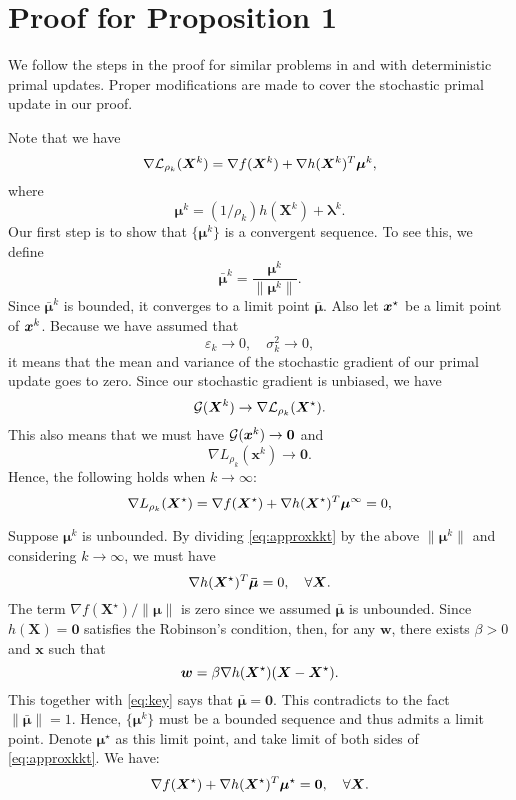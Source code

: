 \section{Proof for Proposition 1}\label{sec:proof}

We follow the steps in the proof for similar problems in \cite{fu2018anchor} and \cite{shi2017penalty} with deterministic primal updates. Proper modifications are made to cover the stochastic primal update in our proof.


Note that we have
              \[     \nabla{\cal L}_{\rho_k}(\boldsymbol{X}^k)= \nabla f(\boldsymbol{X}^k) + \nabla h(\boldsymbol{X}^k)^T\bm \mu^k,          \]
              where 
              \[      \bm \mu^k = (1/\rho_k)h(\bm X^k)+\bm \lambda^k.   
              \]
              Our first step is to show that $\{\bm \mu^k\}$ is a convergent sequence. To see this, we define 
              \[ \bm \bar{\bm \mu}^k = \frac{\bm \mu^k}{\|{\bm \mu}^k\|}. \]
              Since $\bm \bar{\bm \mu}^k$ is bounded, it converges to a limit point $\bm \bar{\bm \mu}$. Also let $\boldsymbol{x}^\star$ be a limit point of $\boldsymbol{x}^k$.
              Because we have assumed that 
              $$\varepsilon_k\rightarrow 0,\quad \sigma_k^2\rightarrow 0,$$ 
              it means that the mean and variance of the stochastic gradient of our primal update goes to zero.
              Since our stochastic gradient is unbiased, we have
              \[       {\cal G}(\boldsymbol{X}^k) \rightarrow \nabla {\cal L}_{\rho_k}(\boldsymbol{X}^\star). \]  
              This also means that  we must have ${\cal G}(\boldsymbol{x}^k)\rightarrow \bm 0$ and $$\nabla L_{\rho_k}(\bm x^k)\rightarrow \bm 0.$$
     Hence, the following holds when $k\rightarrow \infty$:
              \begin{equation}\label{eq:approxkkt}
                 \nabla L_{\rho_k}(\bm X^\star)=\nabla f(\boldsymbol{X}^\star)+\nabla h(\boldsymbol{X}^\star)^T\bm {\bm \mu}^\infty = 0,
              \end{equation}           
               
               
              Suppose $\bm \mu^k$ is unbounded. By dividing \eqref{eq:approxkkt} by the above $\|\bm \mu^k\|$ and considering $k\rightarrow \infty$, we must have 
              \begin{equation}\label{eq:key}
                \nabla h(\boldsymbol{X}^\star)^T\bm \bar{\bm \mu}= 0,\quad \forall \boldsymbol{X}.    
              \end{equation}               
              The term $\nabla f(\bm X^\star)/\|\bm \mu\|$ is zero since we assumed $\bar{\bm \mu}$ is unbounded.
              Since $h(\bm X)=\bm 0$ satisfies the Robinson's condition, then, for any $\bm w$, there exists $\beta>0$ and $\bm x$ such that
              \[      \bm w = \beta \nabla h(\boldsymbol{X}^\star)(\boldsymbol{X}-\boldsymbol{X}^\star).        \]
              This together with \eqref{eq:key} says that $\bar{\bm \mu}=\bm 0$. This contradicts to the fact $\|\bar{\bm \mu}\|=1$. Hence, $\{ \bm \mu^k \}$ must be a bounded sequence and thus admits a limit point. Denote $\bm \mu^\star$ as this limit point, and take limit of both sides of \eqref{eq:approxkkt}. We have:
              \begin{equation}
              \nabla f(\boldsymbol{X}^\star)+\nabla h(\boldsymbol{X}^\star)^T\bm \mu^\star= \bm 0,\quad \forall \boldsymbol{X}.
              \end{equation}
               
